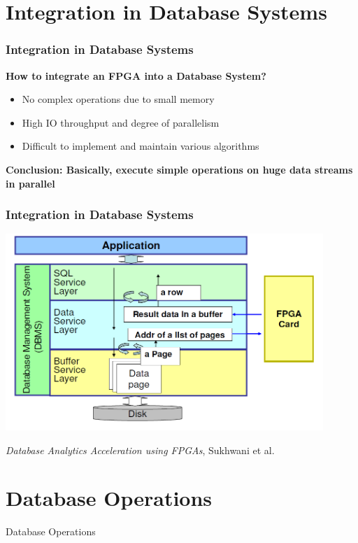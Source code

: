 \documentclass{beamer}
\begin{document}
\section{Integration in Database Systems}
\begin{frame}
	\frametitle{Integration in Database Systems}
	
	\textbf{How to integrate an FPGA into a Database System?}
	\begin{itemize}
		\item No complex operations due to small memory
		\item High IO throughput and degree of parallelism
		\item Difficult to implement and maintain various algorithms
	\end{itemize}
	\vspace*{1cm}
	\textbf{Conclusion: Basically, execute simple operations on huge data streams in parallel}
\end{frame}

\begin{frame}
\frametitle{Integration in Database Systems}
\begin{center}
	\includegraphics[width=0.9\textwidth]{img/integration.PNG}
\end{center}
\begin{center}
	\small \emph{Database Analytics Acceleration using FPGAs}, Sukhwani et al.
\end{center}
\end{frame}

\section{Database Operations}
\begin{frame}
	\begin{center}
		\huge Database Operations
	\end{center}
\end{frame}
\end{document}
